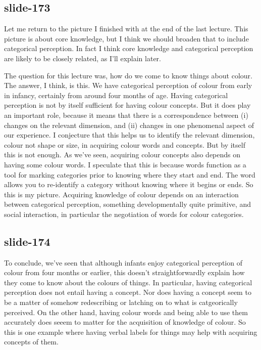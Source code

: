 \documentclass[12pt,\papersize]{extarticle}
\begin{document}
 
\subsection{slide-173}
Let me return to the picture I finished with at the end of the last lecture.
This picture is about core knowledge, but I think we should broaden that to include categorical perception.
In fact I think core knowledge and categorical perception are likely to be closely related, as I'll explain later.
 
The question for this lecture was, how do we come to know things about colour.
The answer, I think, is this.
We have categorical perception of colour from early in infancy, certainly from around four months of age.
Having categorical perception is not by itself sufficient for having colour concepts.
But it does play an important role, because it means that there is a correspondence between (i) changes on the relevant dimension, and (ii) changes in one phenomenal aspect of our experience.
I conjecture that this helps us to identify the relevant dimension, colour not shape or size, in acquiring colour words and concepts.
But by itself this is not enough.
As we've seen, acquiring colour concepts also depends on having some colour words.
I speculate that this is because words function as a tool for marking categories prior to knowing where they start and end.
The word allows you to re-identify a category without knowing where it begins or ends.
So this is my picture.
Acquiring knowledge of colour depends on an interaction between categorical perception, something developmentally quite primitive, and social interaction, in particular the negotiation of words for colour categories.
 
 
\subsection{slide-174}
To conclude, we've seen that although infants enjoy categorical perception of colour from four months or earlier,
this doesn't straightforwardly explain how they come to know about the colours of things.
In particular, having categorical perception does not entail having a concept.
Nor does having a concept seem to be a matter of somehow redescribing or latching on to what is catgeorically perceived.
On the other hand, having colour words and being able to use them accurately does seeem to matter for the acquisition of knowledge of colour.
So this is one example where having verbal labels for things may help with acquiring concepts of them.
 
\end{document}
